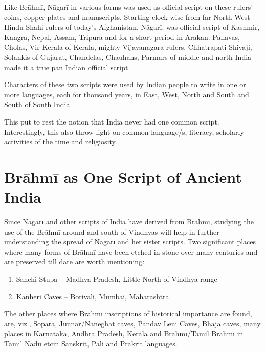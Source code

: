 Like Brāhmī, Nāgarī in various forms was used as official script on these rulers’ coins, copper plates and manuscripts. Starting clock-wise from far North-West Hindu Shahi rulers of today’s Afghanistan, Nāgarī. was official script of Kashmir, Kangra, Nepal, Assam, Tripura and for a short period in Arakan. Pallavas, Cholas, Vir Kerala of Kerala, mighty Vijayanagara rulers, Chhatrapati Shivaji, Solankis of Gujarat, Chandelas, Chauhans, Parmars of middle and north India – made it a true pan Indian official script.

Characters of these two scripts were used by Indian people to write in one or more languages, each for thousand years, in East, West, North and South and South of South India.

This put to rest the notion that India never had one common script. Interestingly, this also throw light on common language/s, literacy, scholarly activities of the time and religiosity.


\section*{Brāhmī as One Script of Ancient India}

Since Nāgarī and other scripts of India have derived from Brāhmī, studying the use of the Brāhmī around and south of Vindhyas will help in further understanding the spread of Nāgarī and her sister scripts. Two significant places where many forms of Brāhmī have been etched in stone over many centuries and are preserved till date are worth mentioning:

\begin{enumerate}[{\rm 1)}]
\itemsep=0pt
\item Sanchi Stupa – Madhya Pradesh, Little North of Vindhya range

 \item Kanheri Caves – Borivali, Mumbai, Maharashtra

\end{enumerate}

The other places where Brāhmī inscriptions of historical importance are found, are, viz., Sopara, Junnar/Naneghat caves, Pandav Leni Caves, Bhaja caves, many places in Karnataka, Andhra Pradesh, Kerala and Brāhmī/Tamil Brāhmī in Tamil Nadu etcin Sanskrit, Pali and Prakrit languages.

